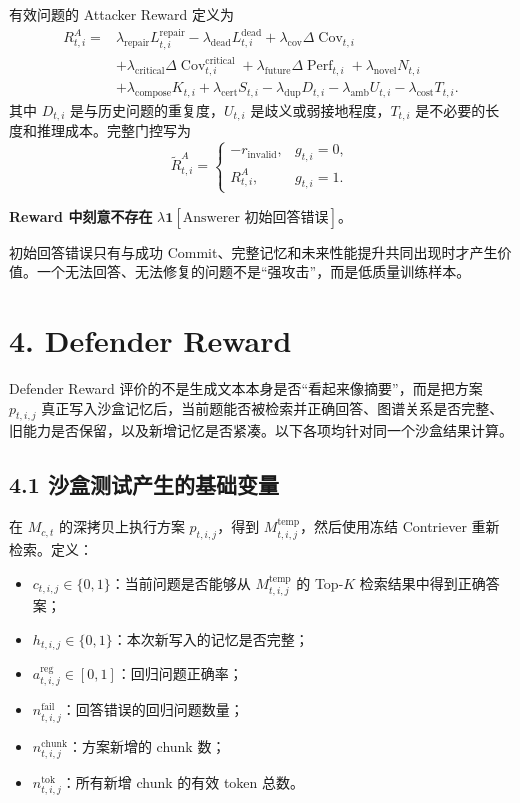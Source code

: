 \documentclass[a4paper,11pt]{article}
\begin{document}
有效问题的 Attacker Reward 定义为
\begin{align*}
    R^A_{t,i}
    ={}&
    \lambda_{\mathrm{repair}}L_{t,i}^{\mathrm{repair}}
    -\lambda_{\mathrm{dead}}L_{t,i}^{\mathrm{dead}}
    +\lambda_{\mathrm{cov}}\Delta\operatorname{Cov}_{t,i}\nonumber\\
    &+\lambda_{\mathrm{critical}}
      \Delta\operatorname{Cov}^{\mathrm{critical}}_{t,i}
    +\lambda_{\mathrm{future}}\Delta\operatorname{Perf}_{t,i}
    +\lambda_{\mathrm{novel}}N_{t,i}\nonumber\\
    &+\lambda_{\mathrm{compose}}K_{t,i}
    +\lambda_{\mathrm{cert}}S_{t,i}
    -\lambda_{\mathrm{dup}}D_{t,i}
    -\lambda_{\mathrm{amb}}U_{t,i}
    -\lambda_{\mathrm{cost}}T_{t,i}.
\end{align*}
其中 $D_{t,i}$ 是与历史问题的重复度，$U_{t,i}$ 是歧义或弱接地程度，$T_{t,i}$ 是不必要的长度和推理成本。完整门控写为
\[
    \widetilde R^A_{t,i}
    =
    \begin{cases}
        -r_{\mathrm{invalid}}, & g_{t,i}=0,\\
        R^A_{t,i}, & g_{t,i}=1.
    \end{cases}
\]

\begin{implbox}
\textbf{Reward 中刻意不存在}
$\lambda\mathbf{1}[\text{Answerer 初始回答错误}]$。

初始回答错误只有与成功 Commit、完整记忆和未来性能提升共同出现时才产生价值。一个无法回答、无法修复的问题不是“强攻击”，而是低质量训练样本。
\end{implbox}

\section*{4. Defender Reward}

Defender Reward 评价的不是生成文本本身是否“看起来像摘要”，而是把方案
$p_{t,i,j}$ 真正写入沙盒记忆后，当前题能否被检索并正确回答、图谱关系是否完整、旧能力是否保留，以及新增记忆是否紧凑。以下各项均针对同一个沙盒结果计算。

\subsection*{4.1 沙盒测试产生的基础变量}

在 $M_{c,t}$ 的深拷贝上执行方案 $p_{t,i,j}$，得到
$M^{\mathrm{temp}}_{t,i,j}$，然后使用冻结 Contriever 重新检索。定义：

\begin{itemize}
    \item $c_{t,i,j}\in\{0,1\}$：当前问题是否能够从
    $M^{\mathrm{temp}}_{t,i,j}$ 的 Top-$K$ 检索结果中得到正确答案；
    \item $h_{t,i,j}\in\{0,1\}$：本次新写入的记忆是否完整；
    \item $a^{\mathrm{reg}}_{t,i,j}\in[0,1]$：回归问题正确率；
    \item $n^{\mathrm{fail}}_{t,i,j}$：回答错误的回归问题数量；
    \item $n^{\mathrm{chunk}}_{t,i,j}$：方案新增的 chunk 数；
    \item $n^{\mathrm{tok}}_{t,i,j}$：所有新增 chunk 的有效 token 总数。
\end{itemize}
\end{document}
